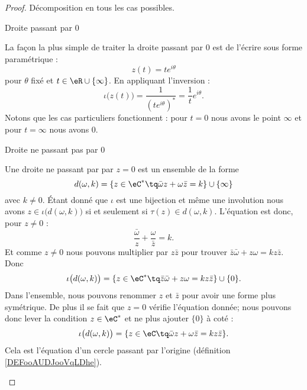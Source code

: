 \begin{proof}
    
    Décomposition en tous les cas possibles.
    \begin{subproof}
        \item[Droite passant par \( 0\)]

            La façon la plus simple de traiter la droite passant par \( 0\) est de l'écrire sous forme paramétrique :
            \begin{equation}
                z(t)=t e^{i\theta}
            \end{equation}
            pour \( \theta\) fixé et \( t\in \eR\cup\{ \infty \}\). En appliquant l'inversion :
            \begin{equation}
                \iota\big( z(t) \big)=\frac{1}{ (t e^{i\theta})^* }=\frac{1}{ t } e^{i\theta}.
            \end{equation}
            Notons que les cas particuliers fonctionnent : pour \( t=0\) nous avons le point \( \infty\) et pour \( t=\infty\) nous avons \( 0\).

        \item[Droite ne passant pas par \( 0\)]

            Une droite ne passant par par \( z=0\) est un ensemble de la forme
            \begin{equation}
                d(\omega,k)=\{ z\in \eC^*\tq \bar\omega z+\omega\bar z=k \}\cup \{ \infty \}
            \end{equation}
            avec \( k\neq 0\). Étant donné que \( \iota\) est une bijection et même une involution nous avons \( z\in\iota\big( d(\omega,k) \big)\) si et seulement si \( \tau(z)\in d(\omega,k)\). L'équation est donc, pour \( z\neq 0\) :
            \begin{equation}
                \frac{ \bar\omega }{ z }+\frac{ \omega }{ \bar z }=k.
            \end{equation}
            Et comme \( z\neq 0\) nous pouvons multiplier par \( z\bar z\) pour trouver \( \bar z\bar \omega+z\omega=kz\bar z\). Donc
            \begin{equation}
                \iota\big( d(\omega,k) \big)=\{ z\in \eC^*\tq  \bar z\bar \omega+z\omega=kz\bar z\}\cup\{ 0 \}.
            \end{equation}
            Dans l'ensemble, nous pouvons renommer \( z\) et \( \bar z\) pour avoir une forme plus symétrique. De plus il se fait que \( z=0\) vérifie l'équation donnée; nous pouvons donc lever la condition \( z\in \eC^*\) et ne plus ajouter \( \{ 0 \}\) à coté :
            \begin{equation}
                \iota\big( d(\omega,k) \big)=\{ z\in \eC\tq  \bar \omega z+\omega\bar z=kz\bar z\}.
            \end{equation}
            Cela est l'équation d'un cercle passant par l'origine (définition \ref{DEFooAUDJooVqLDhe}).
            

\end{subproof}
\end{proof}
